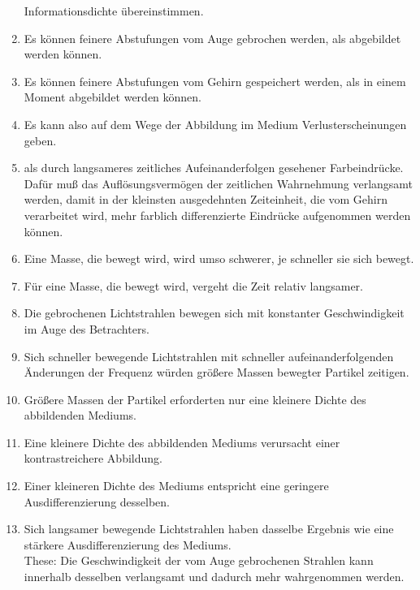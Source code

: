 \documentclass[
]{article}
\begin{document}
\begin{enumerate}
  Informationsdichte übereinstimmen.\\
\item
  Es können feinere Abstufungen vom Auge gebrochen werden, als
  abgebildet werden können.\\
\item
  Es können feinere Abstufungen vom Gehirn gespeichert werden, als in
  einem Moment abgebildet werden können.\\
\item
  Es kann also auf dem Wege der Abbildung im Medium Verlusterscheinungen
  geben.\\
\item
  als durch langsameres zeitliches Aufeinanderfolgen gesehener
  Farbeindrücke. Dafür muß das Auflösungsvermögen der zeitlichen
  Wahrnehmung verlangsamt werden, damit in der kleinsten ausgedehnten
  Zeiteinheit, die vom Gehirn verarbeitet wird, mehr farblich
  differenzierte Eindrücke aufgenommen werden können.\\
\item
  Eine Masse, die bewegt wird, wird umso schwerer, je schneller sie sich
  bewegt.\\
\item
  Für eine Masse, die bewegt wird, vergeht die Zeit relativ langsamer.\\
\item
  Die gebrochenen Lichtstrahlen bewegen sich mit konstanter
  Geschwindigkeit im Auge des Betrachters.\\
\item
  Sich schneller bewegende Lichtstrahlen mit schneller
  aufeinanderfolgenden Änderungen der Frequenz würden größere Massen
  bewegter Partikel zeitigen.\\
\item
  Größere Massen der Partikel erforderten nur eine kleinere Dichte des
  abbildenden Mediums.\\
\item
  Eine kleinere Dichte des abbildenden Mediums verursacht einer
  kontrastreichere Abbildung.\\
\item
  Einer kleineren Dichte des Mediums entspricht eine geringere
  Ausdifferenzierung desselben.\\
\item
  Sich langsamer bewegende Lichtstrahlen haben dasselbe Ergebnis wie
  eine stärkere Ausdifferenzierung des Mediums.\\
  These: Die Geschwindigkeit der vom Auge gebrochenen Strahlen kann
  innerhalb desselben verlangsamt und dadurch mehr wahrgenommen werden.
\end{enumerate}
\end{document}
